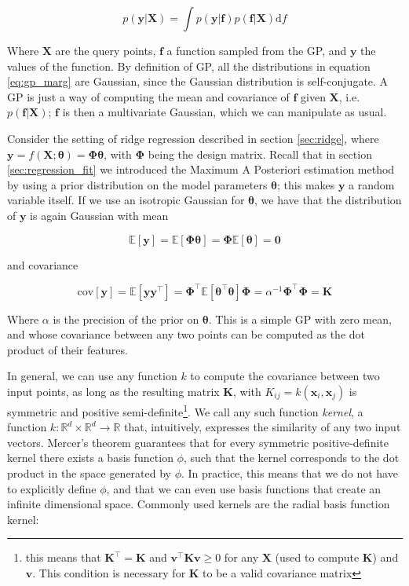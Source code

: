 \documentclass[12pt]{book}
\begin{document}
\begin{equation}
\label{eq:gp_marg}
p(\bm y\vert\bm X)=\int p(\bm y\vert \bm f)p(\bm f\vert\bm X)\text{d}f
\end{equation}

Where $\bm X$ are the query points, $\bm f$ a function sampled from the GP, and $\bm y$ the values of the function. By definition of GP, all the distributions in equation \ref{eq:gp_marg} are Gaussian, since the Gaussian distribution is self-conjugate. A GP is just a way of computing the mean and covariance of $\bm f$ given $\bm X$, i.e. $p(\bm f\vert\bm X)$; $\bm f$ is then a multivariate Gaussian, which we can manipulate as usual.

Consider the setting of ridge regression described in section \ref{sec:ridge}, where $\bm y=f(\bm X;\bm\theta)=\bm\Phi\bm\theta$, with $\bm\Phi$ being the design matrix. Recall that in section \ref{sec:regression_fit} we introduced the Maximum A Posteriori estimation method by using a prior distribution on the model parameters $\bm\theta$; this makes $\bm y$ a random variable itself. If we use an isotropic Gaussian for $\bm\theta$, we have that the distribution of $\bm y$ is again Gaussian with mean

\begin{equation}
\mathbb{E}[\bm y]=\mathbb{E}[\bm\Phi\bm\theta]=\bm\Phi\mathbb{E}[\bm\theta]=\bm 0
\end{equation}

and covariance

\begin{equation}
\text{cov}[\bm y]=\mathbb{E}[\bm y\bm y^\intercal]
=\bm\Phi^\intercal\mathbb{E}[\bm\theta^\intercal\bm\theta]\bm\Phi
=\alpha^{-1}\bm\Phi^\intercal\bm\Phi=\bm K
\end{equation}

Where $\alpha$ is the precision of the prior on $\bm\theta$. This is a simple GP with zero mean, and whose covariance between any two points can be computed as the dot product of their features.

In general, we can use any function $k$ to compute the covariance between two input points, as long as the resulting matrix $\bm K$, with $K_{ij}=k(\bm x_i,\bm x_j)$ is symmetric and positive semi-definite\footnote{this means that $\bm K^\intercal=\bm K$ and $\bm v^\intercal\bm K\bm v\geq 0$ for any $\bm X$ (used to compute $\bm K$) and $\bm v$. This condition is necessary for $\bm K$ to be a valid covariance matrix}. We call any such function  \emph{kernel}, a function $k:\mathbb{R}^d\times\mathbb{R}^d\rightarrow\mathbb{R}$ that, intuitively, expresses the similarity of any two input vectors. Mercer's theorem guarantees that for every symmetric positive-definite kernel there exists a basis function $\phi$, such that the kernel corresponds to the dot product in the space generated by $\phi$. In practice, this means that we do not have to explicitly define $\phi$, and that we can even use basis functions that create an infinite dimensional space. Commonly used kernels are the radial basis function kernel:
\end{document}
